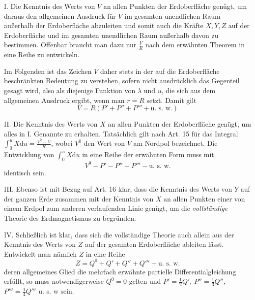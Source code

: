 I. Die Kenntnis des Werts von $V$ an allen Punkten der Erdoberfläche genügt, um daraus den allgemeinen Ausdruck für $V$ im gesamten unendlichen Raum außerhalb der Erdoberfläche abzuleiten und somit auch die Kräfte $X,Y,Z$ auf der Erdoberfläche und im gesamten unendlichen Raum außerhalb davon zu bestimmen. Offenbar braucht man dazu nur $\frac VR$ nach dem erwähnten Theorem in eine Reihe zu entwickeln.

Im Folgenden ist das Zeichen $V$ daher stets in der auf die Erdoberfläche beschränkten Bedeutung zu verstehen, sofern nicht ausdrücklich das Gegenteil gesagt wird, also als diejenige Funktion von $\lambda$ und $u$, die sich aus dem allgemeinen Ausdruck ergibt, wenn man $r=R$ setzt. Damit gilt
\[
V=R(P'+P''+P'''+\text{u. s. w.})
\]

II. Die Kenntnis des Werts von $X$ an allen Punkten der Erdoberfläche genügt, um alles in I. Genannte zu erhalten. Tatsächlich gilt nach Art. 15 für das Integral $\int_0^u X\mathrm{d}u=\frac{V^0-V}{R}$, wobei $V^0$ den Wert von $V$ am Nordpol bezeichnet. Die Entwicklung von $\int_0^u X\mathrm{d}u$ in eine Reihe der erwähnten Form muss mit
\[
V^0-P'-P''-P'''-\text{u. s. w.}
\]
identisch sein.

III. Ebenso ist mit Bezug auf Art. 16 klar, dass die Kenntnis des Werts von $Y$ auf der ganzen Erde zusammen mit der Kenntnis von $X$ an allen Punkten einer von einem Erdpol zum anderen verlaufenden Linie genügt, um die \textit{vollständige} Theorie des Erdmagnetismus zu begründen.

IV. Schließlich ist klar, dass sich die vollständige Theorie auch allein aus der Kenntnis des Werts von $Z$ auf der gesamten Erdoberfläche ableiten lässt. Entwickelt man nämlich $Z$ in eine Reihe
\[
Z=Q^0+Q'+Q''+Q'''+\text{u. s. w.}
\]
deren allgemeines Glied die mehrfach erwähnte partielle Differentialgleichung erfüllt, so muss notwendigerweise $Q^0=0$ gelten und $P'=\frac12Q'$, $P''=\frac13Q''$, $P'''=\frac14Q'''$ u. s. w sein.

